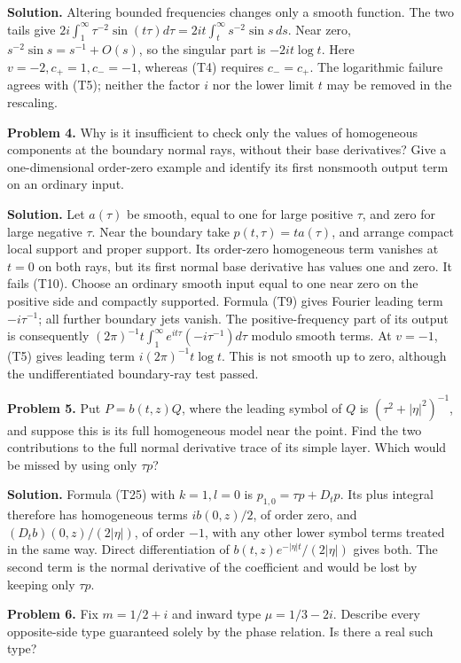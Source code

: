 \documentclass[
  11pt,
]{article}
\begin{document}
\textbf{Solution.} Altering bounded frequencies changes only a smooth
function. The two tails give \(2i\int_1^\infty\tau^{-2}\sin(t\tau)d\tau
=2it\int_t^\infty s^{-2}\sin s\,ds\). Near zero,
\(s^{-2}\sin s=s^{-1}+O(s)\), so the singular part is \(-2it\log t\).
Here \(v=-2,c_+=1,c_-=-1\), whereas (T4) requires \(c_-=c_+\). The
logarithmic failure agrees with (T5); neither the factor \(i\) nor the
lower limit \(t\) may be removed in the rescaling.

\textbf{Problem 4.} Why is it insufficient to check only the values of
homogeneous components at the boundary normal rays, without their base
derivatives? Give a one-dimensional order-zero example and identify its
first nonsmooth output term on an ordinary input.

\textbf{Solution.} Let \(a(\tau)\) be smooth, equal to one for large
positive \(\tau\), and zero for large negative \(\tau\). Near the
boundary take \(p(t,\tau)=t a(\tau)\), and arrange compact local support
and proper support. Its order-zero homogeneous term vanishes at \(t=0\)
on both rays, but its first normal base derivative has values one and
zero. It fails (T10). Choose an ordinary smooth input equal to one near
zero on the positive side and compactly supported. Formula (T9) gives
Fourier leading term \(-i\tau^{-1}\); all further boundary jets vanish.
The positive-frequency part of its output is consequently
\((2\pi)^{-1}t\int_1^\infty e^{it\tau}(-i\tau^{-1})d\tau\) modulo smooth
terms. At \(v=-1\), (T5) gives leading term \(i(2\pi)^{-1}t\log t\).
This is not smooth up to zero, although the undifferentiated
boundary-ray test passed.

\textbf{Problem 5.} Put \(P=b(t,z)Q\), where the leading symbol of \(Q\)
is \((\tau^2+|\eta|^2)^{-1}\), and suppose this is its full homogeneous
model near the point. Find the two contributions to the full normal
derivative trace of its simple layer. Which would be missed by using
only \(\tau p\)?

\textbf{Solution.} Formula (T25) with \(k=1,l=0\) is
\(p_{1,0}=\tau p+D_t p\). Its plus integral therefore has homogeneous
terms \(ib(0,z)/2\), of order zero, and \((D_tb)(0,z)/(2|\eta|)\), of
order \(-1\), with any other lower symbol terms treated in the same way.
Direct differentiation of \(b(t,z)e^{-|\eta|t}/(2|\eta|)\) gives both.
The second term is the normal derivative of the coefficient and would be
lost by keeping only \(\tau p\).

\textbf{Problem 6.} Fix \(m=1/2+i\) and inward type \(\mu=1/3-2i\).
Describe every opposite-side type guaranteed solely by the phase
relation. Is there a real such type?
\end{document}

